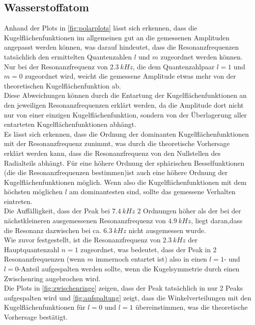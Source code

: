 \subsection{Wasserstoffatom}
Anhand der Plots in \autoref{fig:polarplots} lässt sich erkennen, dass die Kugelflächenfunktionen im allgemeinen gut an die gemessenen Amplituden angepasst werden können, was darauf hindeutet, dass die Resonanzfrequenzen tatsächlich den ermittelten Quantenzahlen $l$ und $m$ zugeordnet werden können. \\
Nur bei der Resonanzfrequenz von $\qty{2.3}{kHz}$, die dem Quantenzahlpaar $l=1$ und $m=0$ zugeordnet wird, weicht die gemessene Amplitude etwas mehr von der theoretischen Kugelflächenfunktion ab. \\
Diese Abweichungen können durch die Entartung der Kugelflächenfunktionen an den jeweiligen Resonanzfrequenzen erklärt werden, da die Amplitude dort nicht nur von einer einzigen Kugelflächenfunktion, sondern von der Überlagerung aller entarteten Kugelflächenfunktionen abhängt. \\
Es lässt sich erkennen, dass die Ordnung der dominanten Kugelflächenfunktionen mit der Resonanzfrequenz zunimmt, was durch die theoretische Vorhersage erklärt werden kann, dass die Resonanzfrequenz von den Nullstellen des Radialteils abhängt. Für eine höhere Ordnung der sphärischen Besselfunktionen (die die Resonanzfrequenzen bestimmen)ist auch eine höhere Ordnung der Kugelflächenfunktionen möglich. Wenn also die Kugelflächenfunktionen mit dem höchsten möglichen $l$ am dominantesten sind, sollte das gemessene Verhalten eintreten. \\
Die Auffälligkeit, dass der Peak bei $\qty{7.4}{kHz}$ 2 Ordnungen höher als der bei der nächstkleineren ausgemessenen Resonanzfrequenz von $\qty{4.9}{kHz}$, liegt daran,dass die Resonanz dazwischen bei ca. $\qty{6.3}{kHz}$ nicht ausgemessen wurde. \\ 

Wie zuvor festgestellt, ist die Resonanzfrequenz von $\qty{2.3}{kHz}$ der Hauptquantenzahl $n=1$ zugeordnet, was bedeutet, dass der Peak in 2 Resonanzfrequenzen (wenn $m$ immernoch entartet ist) also in einen $l=1$- und $l=0$-Anteil aufgespalten werden sollte, wenn die Kugelsymmetrie durch einen Zwischenring augebrochen wird. \\
Die Plots in \autoref{fig:zwischenringe} zeigen, dass der Peak tatsächlich in nur 2 Peaks aufgespalten wird und \autoref{fig:aufspaltung} zeigt, dass die Winkelverteilungen mit den Kugelflächenfunktionen für $l=0$ und $l=1$ übereinstimmen, was die theoretische Vorhersage bestätigt. \\

\clearpage